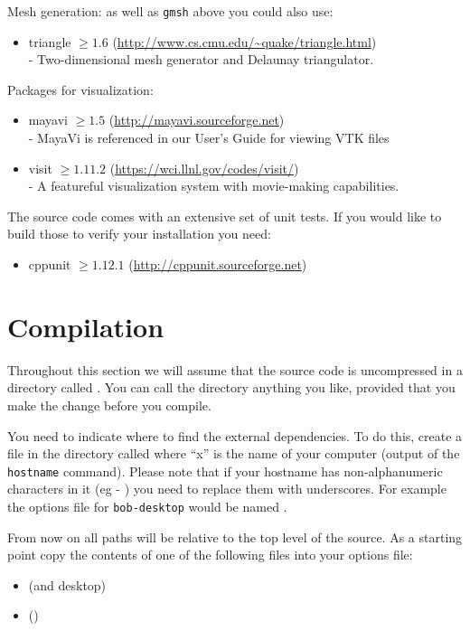 \noindent Mesh generation: as well as \texttt{gmsh} above you could also use:
\begin{itemize}
 \item triangle $\geq 1.6$ (\url{http://www.cs.cmu.edu/~quake/triangle.html}) \\-
        Two-dimensional mesh generator and Delaunay triangulator.
\end{itemize}

Packages for visualization:
\begin{itemize}
 \item mayavi $\geq 1.5$ (\url{http://mayavi.sourceforge.net}) \\-
        MayaVi is referenced in our User's Guide for viewing VTK files
 \item visit $\geq 1.11.2$ (\url{https://wci.llnl.gov/codes/visit/}) \\-
        A featureful visualization system with movie-making capabilities.
\end{itemize}



The source code comes with an extensive set of unit tests. If you would like to
build those to verify your installation you need:
\begin{itemize}
 \item cppunit $\geq 1.12.1$ (\url{http://cppunit.sourceforge.net})
\end{itemize}

\section{Compilation}\label{sec:compilesrc}
Throughout this section we will assume that the source code is uncompressed in a directory called .
You can call the directory anything you like, provided that you make the change before you compile.

You need to indicate where to find the external dependencies.
To do this, create a file in the  directory called  where ``x'' is the name of your computer (output of the \texttt{hostname} command).
Please note that if your hostname has non-alphanumeric characters in it (eg - ) you need to replace them with underscores.
For example the options file for \texttt{bob-desktop} would be named .

From now on all paths will be relative to the top level of the source.
As a starting point copy the contents of one of the following files into your options file:
\begin{itemize}
\item {} (\linux and \macosx desktop)
\item {} (\winxp)
\end{itemize}

